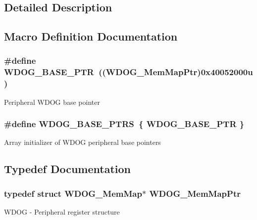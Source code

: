 \subsection{Detailed Description}


\subsection{Macro Definition Documentation}
\hypertarget{group___w_d_o_g___peripheral_ga72fb27c7bc1ae124f180d8f2c7b9fa79}{}
\subsubsection[{W\+D\+O\+G\+\_\+\+B\+A\+S\+E\+\_\+\+P\+T\+R}]{\setlength{\rightskip}{0pt plus 5cm}\#define W\+D\+O\+G\+\_\+\+B\+A\+S\+E\+\_\+\+P\+T\+R~(({\bf W\+D\+O\+G\+\_\+\+Mem\+Map\+Ptr})0x40052000u)}\label{group___w_d_o_g___peripheral_ga72fb27c7bc1ae124f180d8f2c7b9fa79}
Peripheral W\+D\+O\+G base pointer \hypertarget{group___w_d_o_g___peripheral_ga8d50dba3756857eed1783b3d726d40d8}{}
\subsubsection[{W\+D\+O\+G\+\_\+\+B\+A\+S\+E\+\_\+\+P\+T\+R\+S}]{\setlength{\rightskip}{0pt plus 5cm}\#define W\+D\+O\+G\+\_\+\+B\+A\+S\+E\+\_\+\+P\+T\+R\+S~\{ {\bf W\+D\+O\+G\+\_\+\+B\+A\+S\+E\+\_\+\+P\+T\+R} \}}\label{group___w_d_o_g___peripheral_ga8d50dba3756857eed1783b3d726d40d8}
Array initializer of W\+D\+O\+G peripheral base pointers 

\subsection{Typedef Documentation}
\hypertarget{group___w_d_o_g___peripheral_gaed99974fa14a19f21a8770728ff09af3}{}
\subsubsection[{W\+D\+O\+G\+\_\+\+Mem\+Map\+Ptr}]{\setlength{\rightskip}{0pt plus 5cm}typedef struct {\bf W\+D\+O\+G\+\_\+\+Mem\+Map}$\ast$ {\bf W\+D\+O\+G\+\_\+\+Mem\+Map\+Ptr}}\label{group___w_d_o_g___peripheral_gaed99974fa14a19f21a8770728ff09af3}
W\+D\+O\+G -\/ Peripheral register structure 